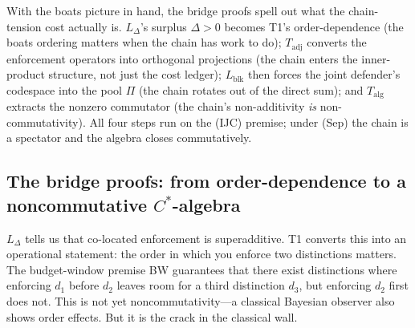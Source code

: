 \documentclass[11pt]{article}
\theoremstyle{remark}
\begin{document}
\smallskip\noindent With the boats picture in hand, the bridge proofs spell out what the chain-tension cost actually is.  $L_\Delta$'s surplus $\Delta > 0$ becomes T1's order-dependence (the boats ordering matters when the chain has work to do); $T_{\mathrm{adj}}$ converts the enforcement operators into orthogonal projections (the chain enters the inner-product structure, not just the cost ledger); $L_{\mathrm{blk}}$ then forces the joint defender's codespace into the pool $\Pi$ (the chain rotates out of the direct sum); and $T_{\mathrm{alg}}$ extracts the nonzero commutator (the chain's non-additivity \emph{is} non-commutativity).  All four steps run on the (IJC) premise; under (Sep) the chain is a spectator and the algebra closes commutatively.

\subsection{The bridge proofs: from order-dependence to a noncommutative $C^*$-algebra}
\label{sec:operator_bridge}

\noindent $L_\Delta$ tells us that co-located enforcement is superadditive.  T1 converts this into an operational statement: the order in which you enforce two distinctions matters.  The budget-window premise BW guarantees that there exist distinctions where enforcing $d_1$ before $d_2$ leaves room for a third distinction $d_3$, but enforcing $d_2$ first does not.  This is not yet noncommutativity---a classical Bayesian observer also shows order effects.  But it is the crack in the classical wall.
\end{document}

